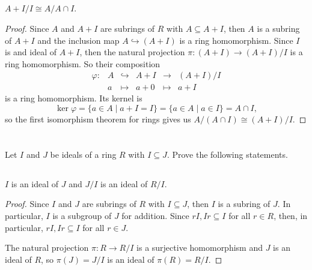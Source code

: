 \documentclass[12pt]{article}
\newenvironment{problem}
    {\begin{lrbox}{\mybox}\begin{minipage}{0.98\textwidth}}
    {\end{minipage}\end{lrbox}\begin{center}\framebox[\textwidth]{\usebox{\mybox}}\end{center}}
\theoremstyle{definition}
\renewcommand{\phi}{\varphi}
\newcommand{\isom}{\cong}
\newcommand{\inc}{\hookrightarrow}
\begin{document}
\subsection{}
\begin{problem}
    $A + I/I \isom A/A \cap I$.
\end{problem}

\begin{proof}
    Since $A$ and $A + I$ are subrings of $R$ with $A \subseteq A + I$, then $A$ is a subring of $A + I$ and the inclusion map $A \inc (A + I)$ is a ring homomorphism. Since $I$ is and ideal of $A + I$, then the natural projection $\pi : (A + I) \to (A + I)/I$  is a ring homomorphism. So their composition
    \[
        \begin{array}{cccccc}
            \phi : & A & \inc & A + I & \to & (A + I)/I \\
                 & a & \mapsto & a + 0 & \mapsto & a + I
        \end{array}
    \]
    is a ring homomorphism. Its kernel is
    \[
        \ker \phi = \{a \in A \mid a + I = I\} = \{a \in A \mid a \in I\} = A \cap I,
    \]
    so the first isomorphism theorem for rings gives us $A/(A \cap I) \isom (A + I)/I$.
    
\end{proof}

\section{}
\begin{problem}
    Let $I$ and $J$ be ideals of a ring $R$ with $I \subseteq J$. Prove the following statements.
\end{problem}

\subsection{}
\begin{problem}
    $I$ is an ideal of $J$ and $J/I$ is an ideal of $R/I$.
\end{problem}

\begin{proof}
    Since $I$ and $J$ are subrings of $R$ with $I \subseteq J$, then $I$ is a subring of $J$. In particular, $I$ is a subgroup of $J$ for addition. Since $rI, Ir \subseteq I$ for all $r \in R$, then, in particular, $rI, Ir \subseteq I$ for all $r \in J$. 
    
    The natural projection $\pi : R \to R/I$ is a surjective homomorphism and $J$ is an ideal of $R$, so $\pi(J) = J/I$ is an ideal of $\pi(R) = R/I$.
    
\end{proof}
\end{document}

